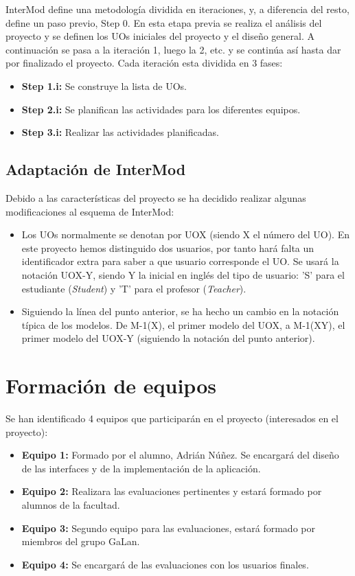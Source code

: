 InterMod define una metodología dividida en iteraciones, y, a diferencia del resto, define un paso previo, Step 0. En esta etapa previa se realiza el análisis del proyecto y se definen los UOs iniciales del proyecto y el diseño general. A continuación se pasa a la iteración 1, luego la 2, etc. y se continúa así hasta dar por finalizado el proyecto. Cada iteración esta dividida en 3 fases:

\begin{itemize}
\item \textbf{Step 1.i:} Se construye la lista de UOs.
\item \textbf{Step 2.i:} Se planifican las actividades para los diferentes equipos.
\item \textbf{Step 3.i:} Realizar las actividades planificadas.
\end{itemize}

\subsection{Adaptación de InterMod}
\label{intermod:adaptacion}

Debido a las características del proyecto se ha decidido realizar algunas modificaciones al esquema de InterMod:

\begin{itemize}
\item Los UOs normalmente se denotan por UOX (siendo X el número del UO). En este proyecto hemos distinguido dos usuarios, por tanto hará falta un identificador extra para saber a que usuario corresponde el UO. Se usará la notación UOX-Y, siendo Y la inicial en inglés del tipo de usuario: 'S' para el estudiante (\textit{Student}) y 'T' para el profesor (\textit{Teacher}).
\item Siguiendo la línea del punto anterior, se ha hecho un cambio en la notación típica de los modelos. De M-1(X), el primer modelo del UOX, a M-1(XY), el primer modelo del UOX-Y (siguiendo la notación del punto anterior).
\end{itemize}

\section{Formación de equipos}
\label{step0:equipos}

Se han identificado 4 equipos que participarán en el proyecto (interesados en el proyecto):

\begin{itemize}
\item \textbf{Equipo 1:} Formado por el alumno, Adrián Núñez. Se encargará del diseño de las interfaces y de la implementación de la aplicación.
\item \textbf{Equipo 2:} Realizara las evaluaciones pertinentes y estará formado por alumnos de la facultad.
\item \textbf{Equipo 3:} Segundo equipo para las evaluaciones, estará formado por miembros del grupo GaLan.
\item \textbf{Equipo 4:} Se encargará de las evaluaciones con los usuarios finales.
\end{itemize}

